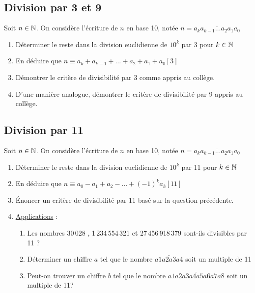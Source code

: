 \documentclass[oneside,12pt]{book}          %
\begin{document}
\subsection{Division par 3 et 9}
Soit ${n\in\mathbb N}$. On considère l'écriture de $n$ en base 10, notée $n=\overline{a_ka_{k-1}\ldots a_2a_1a_0}$
\begin{enumerate}
    \item Déterminer le reste dans la division euclidienne de $10^k$ par 3 pour $k\in{\mathbb N}$
    \item En déduire que $n\equiv a_k+a_{k-1}+\ldots+a_2+a_1+a_0 [3]$
    \item Démontrer le critère de divisibilité par 3 comme appris au collège.
    \item D'une manière analogue, démontrer le critère de divisibilité par 9 appris au collège.
\end{enumerate}



\subsection{Division par 11}
Soit ${n\in\mathbb N}$. On considère l'écriture de $n$ en base 10, notée $n=\overline{a_ka_{k-1}\ldots a_2a_1a_0}$
\begin{enumerate}
    \item Déterminer le reste dans la division euclidienne de $10^k$ par 11 pour $k\in{\mathbb N}$
    \item En déduire que $n\equiv a_0-a_1+a_2-\ldots+(-1)^ka_k [11]$
    \item Énoncer un critère de divisibilité par 11 basé sur la question précédente.
    \item \underline{Applications} :
    \begin{enumerate}
    	\item Les nombres 30\,028 , 1\,234\,554\,321 et 27\,456\,918\,379 sont-ils divisibles par 11 ?
    	\item Déterminer un chiffre $a$ tel que le nombre $\overline{a1a2a3a4}$ soit un multiple de 11
    	\item Peut-on trouver un chiffre $b$ tel que le nombre $\overline{a1a2a3a4a5a6a7a8}$ soit un multiple de 11?
	\end{enumerate}     
\end{enumerate}
\end{document}
